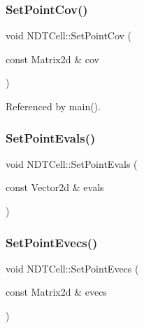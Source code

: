 \mbox{\label{classNDTCell_a6d94d720f43f5ce74b9937668c5ca305}} 
\subsubsection{\texorpdfstring{Set\+Point\+Cov()}{SetPointCov()}}
{\footnotesize\ttfamily void N\+D\+T\+Cell\+::\+Set\+Point\+Cov (\begin{DoxyParamCaption}\item[{const Matrix2d \&}]{cov }\end{DoxyParamCaption})\hspace{0.3cm}{\ttfamily [inline]}}



Referenced by main().

\mbox{\label{classNDTCell_a4293e58ef5d4854c498ea0ad106814f7}} 
\subsubsection{\texorpdfstring{Set\+Point\+Evals()}{SetPointEvals()}}
{\footnotesize\ttfamily void N\+D\+T\+Cell\+::\+Set\+Point\+Evals (\begin{DoxyParamCaption}\item[{const Vector2d \&}]{evals }\end{DoxyParamCaption})\hspace{0.3cm}{\ttfamily [inline]}}

\mbox{\label{classNDTCell_a6737cd9418e06edc8bf4b30a1ae19878}} 
\subsubsection{\texorpdfstring{Set\+Point\+Evecs()}{SetPointEvecs()}}
{\footnotesize\ttfamily void N\+D\+T\+Cell\+::\+Set\+Point\+Evecs (\begin{DoxyParamCaption}\item[{const Matrix2d \&}]{evecs }\end{DoxyParamCaption})\hspace{0.3cm}{\ttfamily [inline]}}

